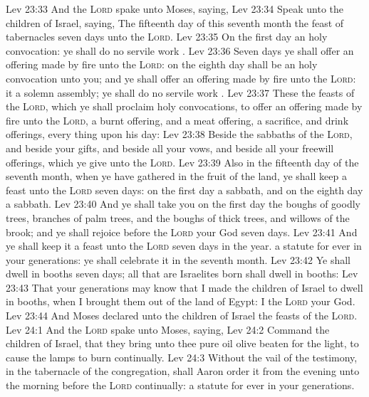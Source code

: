 \vs Lev 23:33 And the \textsc{Lord} spake unto Moses, saying,
\vs Lev 23:34 Speak unto the children of Israel, saying, The fifteenth day of this seventh month  the feast of tabernacles  seven days unto the \textsc{Lord}.
\vs Lev 23:35 On the first day  an holy convocation: ye shall do no servile work .
\vs Lev 23:36 Seven days ye shall offer an offering made by fire unto the \textsc{Lord}: on the eighth day shall be an holy convocation unto you; and ye shall offer an offering made by fire unto the \textsc{Lord}: it  a solemn assembly;  ye shall do no servile work .
\vs Lev 23:37 These  the feasts of the \textsc{Lord}, which ye shall proclaim  holy convocations, to offer an offering made by fire unto the \textsc{Lord}, a burnt offering, and a meat offering, a sacrifice, and drink offerings, every thing upon his day:
\vs Lev 23:38 Beside the sabbaths of the \textsc{Lord}, and beside your gifts, and beside all your vows, and beside all your freewill offerings, which ye give unto the \textsc{Lord}.
\vs Lev 23:39 Also in the fifteenth day of the seventh month, when ye have gathered in the fruit of the land, ye shall keep a feast unto the \textsc{Lord} seven days: on the first day  a sabbath, and on the eighth day  a sabbath.
\vs Lev 23:40 And ye shall take you on the first day the boughs of goodly trees, branches of palm trees, and the boughs of thick trees, and willows of the brook; and ye shall rejoice before the \textsc{Lord} your God seven days.
\vs Lev 23:41 And ye shall keep it a feast unto the \textsc{Lord} seven days in the year.  a statute for ever in your generations: ye shall celebrate it in the seventh month.
\vs Lev 23:42 Ye shall dwell in booths seven days; all that are Israelites born shall dwell in booths:
\vs Lev 23:43 That your generations may know that I made the children of Israel to dwell in booths, when I brought them out of the land of Egypt: I  the \textsc{Lord} your God.
\vs Lev 23:44 And Moses declared unto the children of Israel the feasts of the \textsc{Lord}.
\vs Lev 24:1 And the \textsc{Lord} spake unto Moses, saying,
\vs Lev 24:2 Command the children of Israel, that they bring unto thee pure oil olive beaten for the light, to cause the lamps to burn continually.
\vs Lev 24:3 Without the vail of the testimony, in the tabernacle of the congregation, shall Aaron order it from the evening unto the morning before the \textsc{Lord} continually:  a statute for ever in your generations.

